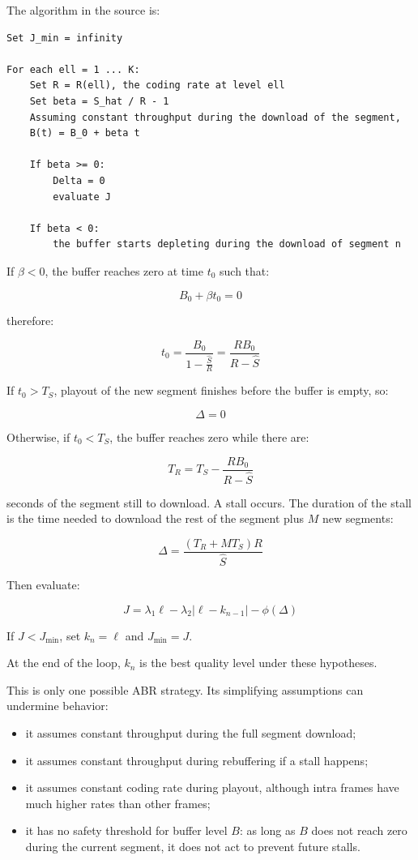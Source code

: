 The algorithm in the source is:

\begin{verbatim}
Set J_min = infinity

For each ell = 1 ... K:
    Set R = R(ell), the coding rate at level ell
    Set beta = S_hat / R - 1
    Assuming constant throughput during the download of the segment,
    B(t) = B_0 + beta t

    If beta >= 0:
        Delta = 0
        evaluate J

    If beta < 0:
        the buffer starts depleting during the download of segment n

\end{verbatim}

If $\beta < 0$, the buffer reaches zero at time $t_0$ such that:

\[
B_0 + \beta t_0 = 0
\]

therefore:

\[
t_0 =
\frac{B_0}{1 - \frac{\hat{S}}{R}}
=
\frac{R B_0}{R - \hat{S}}
\]

If $t_0 > T_S$, playout of the new segment finishes before the buffer is empty, so:

\[
\Delta = 0
\]

Otherwise, if $t_0 < T_S$, the buffer reaches zero while there are:

\[
T_R = T_S - \frac{R B_0}{R - \hat{S}}
\]

seconds of the segment still to download. A stall occurs. The duration of the stall is the time needed to download the rest of the segment plus $M$ new segments:

\[
\Delta = \frac{(T_R + M T_S)R}{\hat{S}}
\]

Then evaluate:

\[
J = \lambda_1 \ell - \lambda_2 |\ell - k_{n-1}| - \phi(\Delta)
\]

If $J < J_{\min}$, set $k_n = \ell$ and $J_{\min} = J$.

At the end of the loop, $k_n$ is the best quality level under these hypotheses.

This is only one possible ABR strategy. Its simplifying assumptions can undermine behavior:

\begin{itemize}
\item it assumes constant throughput during the full segment download;
\item it assumes constant throughput during rebuffering if a stall happens;
\item it assumes constant coding rate during playout, although intra frames have much higher rates than other frames;
\item it has no safety threshold for buffer level $B$: as long as $B$ does not reach zero during the current segment, it does not act to prevent future stalls.
\end{itemize}

